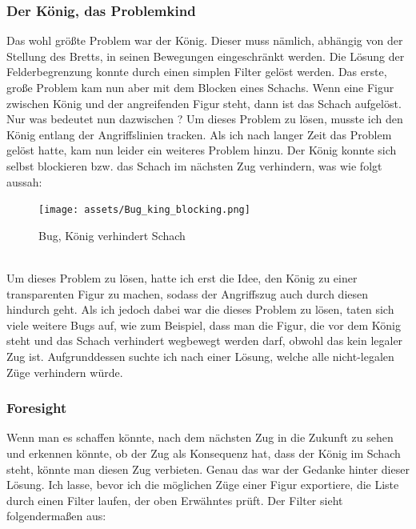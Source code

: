 \documentclass[a4paper, 10pt]{scrartcl}
\begin{document}
\subsubsection*{Der König, das Problemkind}
Das wohl größte Problem war der König. Dieser muss nämlich, abhängig von der Stellung des Bretts,
in seinen Bewegungen eingeschränkt werden. Die Lösung der Felderbegrenzung konnte durch einen simplen Filter gelöst werden. Das erste, große Problem kam nun aber mit dem
Blocken eines Schachs. Wenn eine Figur zwischen König und der angreifenden Figur steht, dann ist das Schach aufgelöst. Nur was bedeutet nun \glqq{}dazwischen \grqq?
Um dieses Problem zu lösen, musste ich den König entlang der Angriffslinien \glqq{}tracken\grqq{}. Als ich nach langer Zeit das Problem gelöst hatte, kam nun leider ein weiteres Problem hinzu. 
Der König konnte sich selbst blockieren bzw. das Schach im nächsten Zug verhindern, was wie folgt aussah: 
\begin{figure}[!h]
\centering
\texttt{[image: assets/Bug\_king\_blocking.png]}
\caption{Bug, König verhindert Schach}
\end{figure}\\
Um dieses Problem zu lösen, hatte ich erst die Idee, den König zu einer \glqq{}transparenten
Figur\grqq{} zu machen, sodass der Angriffszug auch durch diesen hindurch geht. 
Als ich jedoch dabei war die dieses Problem zu lösen, taten sich viele weitere Bugs auf, wie zum Beispiel, dass man die 
Figur, die vor dem König steht und das Schach verhindert wegbewegt werden darf, obwohl das kein legaler Zug ist.
Aufgrunddessen suchte ich nach einer Lösung, welche alle nicht-legalen Züge verhindern würde.

\subsubsection*{Foresight}
Wenn man es schaffen könnte, nach dem nächsten Zug in die Zukunft zu sehen und erkennen könnte, ob
der Zug als Konsequenz hat, dass der König im Schach steht, könnte man diesen Zug verbieten. 
Genau das war der Gedanke hinter dieser Lösung. Ich lasse, bevor ich die möglichen Züge
einer Figur exportiere, die Liste durch einen Filter laufen, der oben Erwähntes prüft.
Der Filter sieht folgendermaßen aus:
\end{document}
